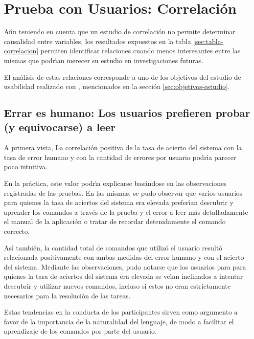 \section{Prueba con Usuarios: Correlaci\'on}
A\'un teniendo en cuenta que un estudio de correlaci\'on no permite determinar causalidad
entre variables, los resultados expuestos en la tabla \ref{sec:tabla-correlacion} 
permiten identificar relaciones cuando menos interesantes entre las mismas que podr{{\'\i}}an
merecer su estudio en investigaciones futuras.

El an\'alisis de estas relaciones corresponde a uno de los objetivos del estudio de usabilidad
realizado con , mencionados en la secci\'on \ref{sec:objetivos-estudio}.

\subsection[Errar es humano: Los usuarios prefieren probar (y equivocarse) a leer]
{Errar es humano: Los usuarios prefieren probar \\ (y equivocarse) a leer}
A primera vista, La correlaci\'on positiva de la tasa de acierto del sistema con la
tasa de error humano y con la cantidad de errores por usuario podr{{\'\i}}a parecer
poco intuitiva.

En la pr\'actica, este valor podr{{\'\i}}a explicarse bas\'andose en las observaciones registradas 
de las pruebas. En las mismas, se pudo observar que varios usuarios para quienes la tasa de
aciertos del sistema era elevada prefer{{\'\i}}an descubrir y aprender los comandos a trav\'es
de la prueba y el error a leer m\'as detalladamente el manual de la aplicaci\'on o tratar de
recordar detenidamente el comando correcto.

As{{\'\i}} tambi\'en, la cantidad total de comandos que utiliz\'o el usuario result\'o relacionada
positivamente con ambas medidas del error humano y con el acierto del sistema. Mediante las 
observaciones, pudo notarse que los usuarios para para quienes la tasa de
aciertos del sistema era elevada se ve{{\'\i}}an inclinados a intentar descubrir y utilizar nuevos
comandos, incluso si estos no eran estrictamente necesarios para la resoluci\'on de las tareas.

Estas tendencias en la conducta de los participantes sirven como argumento a favor de la importancia 
de la naturalidad del lenguaje, de modo a facilitar el aprendizaje de los comandos por parte del usuario.

